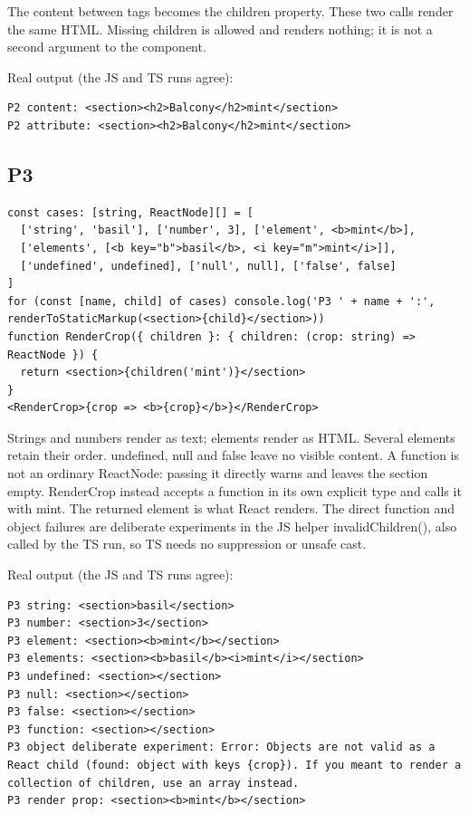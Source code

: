 \documentclass[
  10pt,
  a4paper,
]{article}
\begin{document}
The content between tags becomes the children property. These two calls
render the same HTML. Missing children is allowed and renders nothing;
it is not a second argument to the component.

Real output (the JS and TS runs agree):

\begin{lstlisting}
P2 content: <section><h2>Balcony</h2>mint</section>
P2 attribute: <section><h2>Balcony</h2>mint</section>
\end{lstlisting}

\subsection{P3}\label{p3}

\begin{lstlisting}
const cases: [string, ReactNode][] = [
  ['string', 'basil'], ['number', 3], ['element', <b>mint</b>],
  ['elements', [<b key="b">basil</b>, <i key="m">mint</i>]],
  ['undefined', undefined], ['null', null], ['false', false]
]
for (const [name, child] of cases) console.log('P3 ' + name + ':', renderToStaticMarkup(<section>{child}</section>))
function RenderCrop({ children }: { children: (crop: string) => ReactNode }) {
  return <section>{children('mint')}</section>
}
<RenderCrop>{crop => <b>{crop}</b>}</RenderCrop>
\end{lstlisting}

Strings and numbers render as text; elements render as HTML. Several
elements retain their order. undefined, null and false leave no visible
content. A function is not an ordinary ReactNode: passing it directly
warns and leaves the section empty. RenderCrop instead accepts a
function in its own explicit type and calls it with mint. The returned
element is what React renders. The direct function and object failures
are deliberate experiments in the JS helper invalidChildren(), also
called by the TS run, so TS needs no suppression or unsafe cast.

Real output (the JS and TS runs agree):

\begin{lstlisting}
P3 string: <section>basil</section>
P3 number: <section>3</section>
P3 element: <section><b>mint</b></section>
P3 elements: <section><b>basil</b><i>mint</i></section>
P3 undefined: <section></section>
P3 null: <section></section>
P3 false: <section></section>
P3 function: <section></section>
P3 object deliberate experiment: Error: Objects are not valid as a React child (found: object with keys {crop}). If you meant to render a collection of children, use an array instead.
P3 render prop: <section><b>mint</b></section>
\end{lstlisting}
\end{document}
